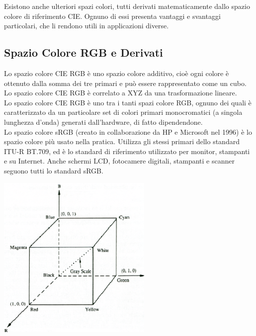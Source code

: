\documentclass[a4paper,11pt]{article} %
\begin{document}
\newpage
Esistono anche ulteriori spazi colori, tutti derivati matematicamente dallo spazio colore di riferimento CIE. Ognuno di essi presenta vantaggi e svantaggi particolari, che li rendono utili in applicazioni diverse.

\subsection{Spazio Colore RGB e Derivati}
Lo spazio colore CIE RGB è uno spazio colore additivo, cioè ogni colore è ottenuto dalla somma dei tre primari e può essere rappresentato come un cubo. Lo spazio colore CIE RGB è correlato a XYZ da una trasformazione lineare.\\
Lo spazio colore CIE RGB è uno tra i tanti spazi colore RGB, ognuno dei quali è caratterizzato da un particolare set di colori primari monocromatici (a singola lunghezza d'onda) generati dall'hardware, di fatto dipendendone.\\
Lo spazio colore sRGB (creato in collaborazione da HP e Microsoft nel 1996) è lo spazio colore più usato nella pratica. Utilizza gli stessi primari dello standard ITU-R BT.709, ed è lo standard di riferimento utilizzato per monitor, stampanti e su Internet. Anche schermi LCD, fotocamere digitali, stampanti e scanner seguono tutti lo standard sRGB.\\
\begin{minipage}{0.33\textwidth}
    \centering
    \includegraphics[width=\linewidth]{RGBcube1}
\end{minipage}%
\end{document}
